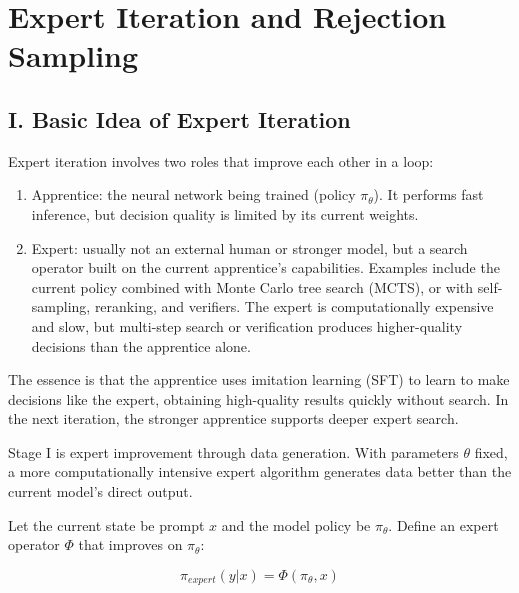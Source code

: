 \setcounter{section}{2}

\hypertarget{expert-iteration-and-rejection-sampling}{%
\section{Expert Iteration and Rejection Sampling}\label{expert-iteration-and-rejection-sampling}}

\hypertarget{i.-basic-idea-of-expert-iteration}{%
\subsection{I. Basic Idea of Expert Iteration}\label{i.-basic-idea-of-expert-iteration}}

Expert iteration involves two roles that improve each other in a loop:

\begin{enumerate}
\def\labelenumi{\arabic{enumi}.}
\tightlist
\item
  Apprentice: the neural network being trained (policy \(\pi_\theta\)). It performs fast inference, but decision quality is limited by its current weights.
\item
  Expert: usually not an external human or stronger model, but a search operator built on the current apprentice's capabilities. Examples include the current policy combined with Monte Carlo tree search (MCTS), or with self-sampling, reranking, and verifiers. The expert is computationally expensive and slow, but multi-step search or verification produces higher-quality decisions than the apprentice alone.
\end{enumerate}

The essence is that the apprentice uses imitation learning (SFT) to learn to make decisions like the expert, obtaining high-quality results quickly without search. In the next iteration, the stronger apprentice supports deeper expert search.

Stage I is expert improvement through data generation. With parameters \(\theta\) fixed, a more computationally intensive expert algorithm generates data better than the current model's direct output.

Let the current state be prompt \(x\) and the model policy be \(\pi_\theta\). Define an expert operator \(\Phi\) that improves on \(\pi_\theta\):

\[
\pi_{expert}(y|x)=\Phi(\pi_\theta,x)
\]

